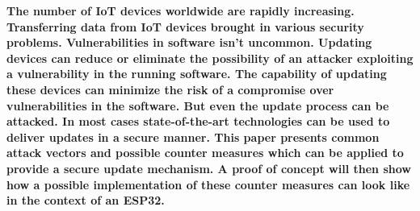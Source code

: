\textbf{The number of IoT devices worldwide are rapidly increasing. Transferring data from IoT devices brought in various security problems. Vulnerabilities in software isn't uncommon. Updating devices can reduce or eliminate the possibility of an attacker exploiting a vulnerability in the running software. The capability of updating these devices can minimize the risk of a compromise over vulnerabilities in the software. But even the update process can be attacked. In most cases state-of-the-art technologies can be used to deliver updates in a secure manner. This paper presents common attack vectors and possible counter measures which can be applied to provide a secure update mechanism. A proof of concept will then show how a possible implementation of these counter measures can look like in the context of an ESP32.}
